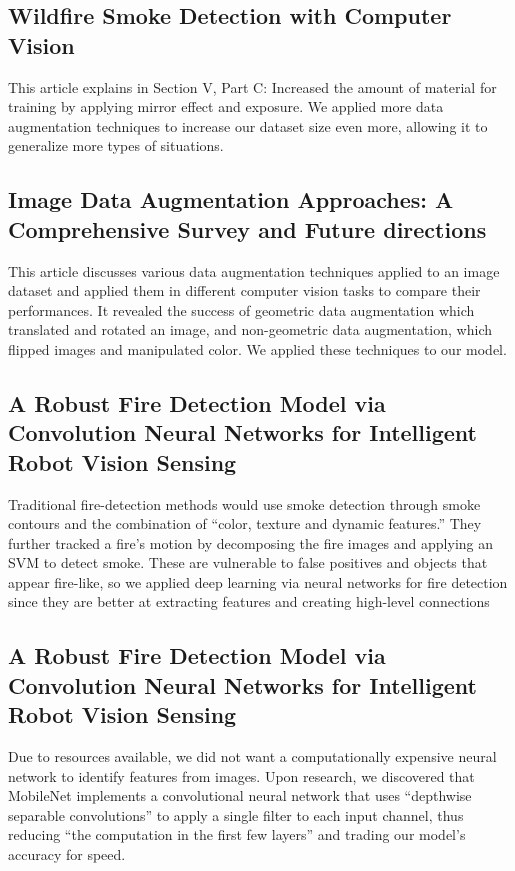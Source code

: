 \subsection{Wildfire Smoke Detection with Computer Vision
	~\citep{Daniel}}

This article explains in Section V, Part C: Increased the amount of material for training by applying mirror effect and exposure. We applied more data augmentation techniques to increase our dataset size even more, allowing it to generalize more types of situations.

\subsection{Image Data Augmentation Approaches: A Comprehensive Survey and Future directions~\citep{kumar2023image}}

This article discusses various data augmentation techniques applied to an image dataset and applied them in different computer vision tasks to compare their performances. It revealed the success of geometric data augmentation which translated and rotated an image, and non-geometric data augmentation, which flipped images and manipulated color. We applied these techniques to our model.

\subsection{A Robust Fire Detection Model via Convolution Neural Networks for Intelligent Robot Vision Sensing~\citep{s22082929}}

Traditional fire-detection methods would use smoke detection through smoke contours and the combination of “color, texture and dynamic features.” They further tracked a fire’s motion by decomposing the fire images and applying an SVM to detect smoke.
These are vulnerable to false positives and objects that appear fire-like, so we applied deep learning via neural networks for fire detection since they are better at extracting features and creating high-level connections

\subsection{A Robust Fire Detection Model via Convolution Neural Networks for Intelligent Robot Vision Sensing~\citep{howard2017mobilenets}}

Due to resources available, we did not want a computationally expensive neural network to identify features from images. Upon research, we discovered that MobileNet implements a convolutional neural network that uses “depthwise separable convolutions” to apply a single filter to each input channel, thus reducing “the computation in the first few layers” and trading our model’s accuracy for speed.

